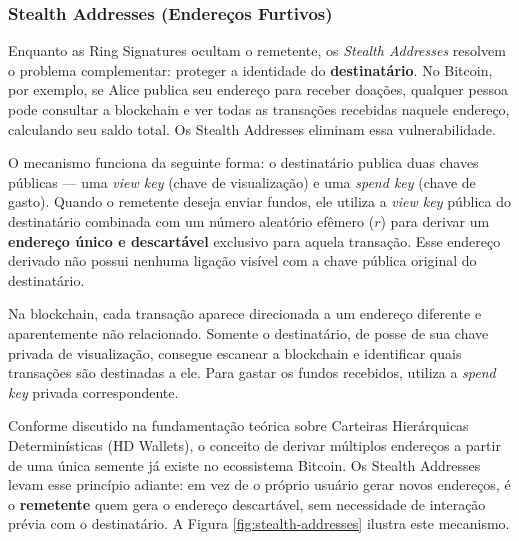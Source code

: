 \subsubsection{Stealth Addresses (Endereços Furtivos)}

Enquanto as Ring Signatures ocultam o remetente, os \textit{Stealth Addresses} resolvem o problema complementar: proteger a identidade do \textbf{destinatário}. No Bitcoin, por exemplo, se Alice publica seu endereço para receber doações, qualquer pessoa pode consultar a blockchain e ver todas as transações recebidas naquele endereço, calculando seu saldo total. Os Stealth Addresses eliminam essa vulnerabilidade.

O mecanismo funciona da seguinte forma: o destinatário publica duas chaves públicas --- uma \textit{view key} (chave de visualização) e uma \textit{spend key} (chave de gasto). Quando o remetente deseja enviar fundos, ele utiliza a \textit{view key} pública do destinatário combinada com um número aleatório efêmero ($r$) para derivar um \textbf{endereço único e descartável} exclusivo para aquela transação. Esse endereço derivado não possui nenhuma ligação visível com a chave pública original do destinatário.

Na blockchain, cada transação aparece direcionada a um endereço diferente e aparentemente não relacionado. Somente o destinatário, de posse de sua chave privada de visualização, consegue escanear a blockchain e identificar quais transações são destinadas a ele. Para gastar os fundos recebidos, utiliza a \textit{spend key} privada correspondente.

Conforme discutido na fundamentação teórica sobre Carteiras Hierárquicas Determinísticas (HD Wallets), o conceito de derivar múltiplos endereços a partir de uma única semente já existe no ecossistema Bitcoin. Os Stealth Addresses levam esse princípio adiante: em vez de o próprio usuário gerar novos endereços, é o \textbf{remetente} quem gera o endereço descartável, sem necessidade de interação prévia com o destinatário. A Figura \ref{fig:stealth-addresses} ilustra este mecanismo.

